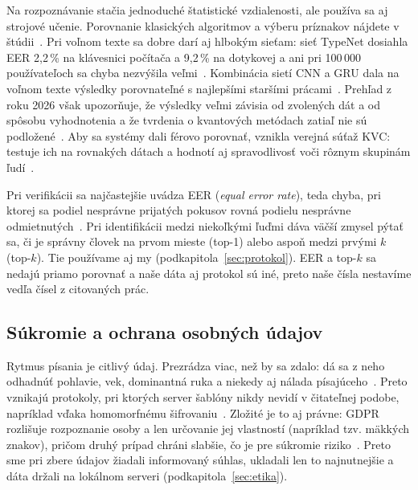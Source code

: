 Na rozpoznávanie stačia jednoduché štatistické vzdialenosti, ale používa sa aj
strojové učenie. Porovnanie klasických algoritmov a výberu príznakov nájdete
v štúdii~\cite{teotia2023}. Pri voľnom texte sa dobre darí aj hlbokým sieťam:
sieť TypeNet dosiahla EER 2,2\,\% na klávesnici počítača a 9,2\,\% na
dotykovej a ani pri 100\,000 používateľoch sa chyba nezvýšila veľmi~\cite{acien2021}.
Kombinácia sietí CNN a GRU dala na voľnom texte výsledky porovnateľné
s najlepšími staršími prácami~\cite{chang2021}. Prehľad z roku 2026 však
upozorňuje, že výsledky veľmi závisia od zvolených dát a od spôsobu
vyhodnotenia a že tvrdenia o kvantových metódach zatiaľ nie sú podložené~\cite{gundogan2026}.
Aby sa systémy dali férovo porovnať, vznikla verejná súťaž KVC: testuje ich na
rovnakých dátach a hodnotí aj spravodlivosť voči rôznym skupinám
ľudí~\cite{stragapede2023}.

Pri verifikácii sa najčastejšie uvádza EER (\emph{equal error rate}), teda
chyba, pri ktorej sa podiel nesprávne prijatých pokusov rovná podielu nesprávne
odmietnutých~\cite{acien2021,stragapede2023}. Pri identifikácii medzi niekoľkými
ľuďmi dáva väčší zmysel pýtať sa, či je správny človek na prvom mieste (top-1)
alebo aspoň medzi prvými $k$ (top-$k$). Tie používame aj my
(podkapitola~\ref{sec:protokol}). EER a top-$k$ sa nedajú priamo porovnať
a naše dáta aj protokol sú iné, preto naše čísla nestavíme vedľa čísel
z citovaných prác.

\subsection{Súkromie a ochrana osobných údajov}

Rytmus písania je citlivý údaj. Prezrádza viac, než by sa zdalo: dá sa z neho
odhadnúť pohlavie, vek, dominantná ruka a niekedy aj nálada písajúceho~\cite{baig2022}.
Preto vznikajú protokoly, pri ktorých server šablóny nikdy nevidí v čitateľnej
podobe, napríklad vďaka homomorfnému šifrovaniu~\cite{baig2022}. Zložité je to aj
právne: GDPR rozlišuje rozpoznanie osoby a len určovanie jej vlastností
(napríklad tzv. mäkkých znakov), pričom druhý prípad chráni slabšie, čo je pre
súkromie riziko~\cite{bisztray2021}. Preto sme pri zbere údajov žiadali
informovaný súhlas, ukladali len to najnutnejšie a dáta držali na lokálnom
serveri (podkapitola~\ref{sec:etika}).
